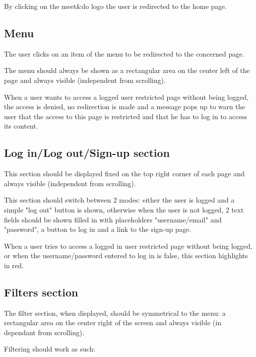 \documentclass[conference]{IEEEtran}
\begin{document}
By clicking on the meet\&do logo the user is redirected to the home page.

\subsection{Menu}

The user clicks on an item of the menu to be redirected to the concerned page.

The menu should always be shown as a rectangular area on the center left of the page and always visible (independent from scrolling).

When a user wants to access a logged user restricted page without being logged, the access is denied, no redirection is made and a message pops up to warn the user that the access to this page is restricted and that he has to log in to access its content.

\subsection{Log in/Log out/Sign-up section}

This section should be displayed fixed on the top right corner of each page and always visible (independent from scrolling).

This section should switch between 2 modes: either the user is logged and a simple "log out" button is shown, otherwise when the user is not logged, 2 text fields should be shown filled in with placeholders "username/email" and "password", a button to log in and a link to the sign-up page.

When a user tries to access a logged in user restricted page without being logged, or when the username/password entered to log in is false, this section highlights in red.

\subsection{Filters section}

The filter section, when displayed, should be symmetrical to the menu: a rectangular area on the center right of the screen and always visible (in dependant from scrolling).

Filtering should work as such:
\end{document}

